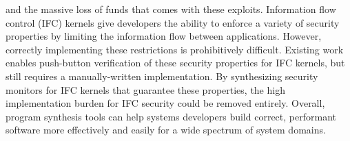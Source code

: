 and the massive loss of funds that comes with these exploits.
Information flow control (IFC) kernels give developers the ability to enforce
a variety of security properties by limiting the information flow between applications.
However, correctly implementing these restrictions is prohibitively difficult.
Existing work enables push-button verification of these security properties for IFC kernels,
but still requires a manually-written implementation.
By synthesizing security monitors for IFC kernels that guarantee these properties,
the high implementation burden for IFC security could be removed entirely.
Overall, program synthesis tools can help systems developers build correct, performant software
more effectively and easily for a wide spectrum of system domains.

